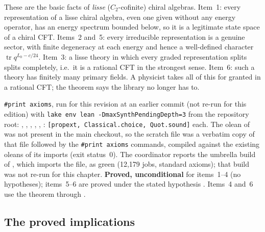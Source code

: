 \begin{physics}
These are the basic facts of \emph{lisse} ($C_2$-cofinite) chiral algebras. Item~1: every representation of a lisse chiral
algebra, even one given without any energy operator, has an energy spectrum bounded below, so it is a legitimate state
space of a chiral CFT. Items~2 and~5: every irreducible representation is a genuine sector, with finite degeneracy at each
energy and hence a well-defined character $\operatorname{tr}q^{L_0-c/24}$. Item~3: a lisse theory in which every graded
representation splits splits completely, i.e.\ it is a rational CFT in the strongest sense. Item~6: such a theory has
finitely many primary fields. A physicist takes all of this for granted in a rational CFT; the theorem says the
library no longer has to.
\end{physics}

\begin{status}
\texttt{\#print axioms}, run for this revision at an earlier commit (not re-run for this edition) with \texttt{lake env lean -DmaxSynthPendingDepth=3} from the
repository root: , ,
, , ,
: \texttt{[propext, Classical.choice, Quot.sound]} each. The olean of
 was not present in the main checkout, so the scratch file was a verbatim copy of that
file followed by the \texttt{\#print axioms} commands, compiled against the existing oleans of its imports (exit status~0). The
coordinator reports the umbrella build of , which imports the file, as green (12,179 jobs, standard
axioms); that build was not re-run for this chapter. \textbf{Proved, unconditional} for items~1--4 (no hypotheses);
items~5--6 are proved under the stated hypothesis . Items~4 and~6 use the theorem  through
.
\end{status}

\subsection{The proved implications}

